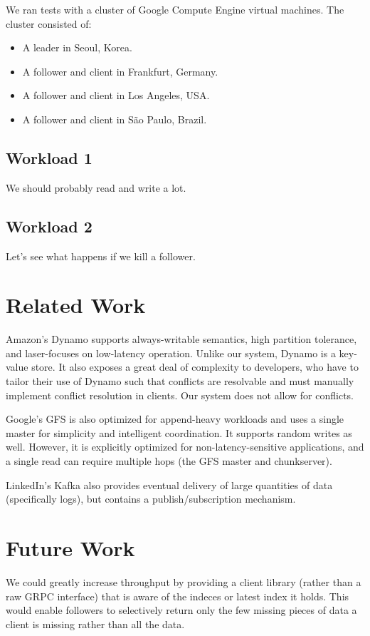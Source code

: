 \documentclass[11pt,english,twocolumn]{article}
\begin{document}
We ran tests with a cluster of Google Compute Engine virtual
machines. The cluster consisted of:

\begin{itemize}
	\item A leader in Seoul, Korea.
	\item A follower and client in Frankfurt, Germany.
	\item A follower and client in Los Angeles, USA.
	\item A follower and client in São Paulo, Brazil.
\end{itemize}

\subsection{Workload 1}
We should probably read and write a lot.

\subsection{Workload 2}
Let's see what happens if we kill a follower.

\section{Related Work}
Amazon's Dynamo \cite{Dynamo} supports always-writable semantics, high partition
tolerance, and laser-focuses on low-latency operation. Unlike our system, Dynamo
is a key-value store. It also exposes a great deal of complexity to developers,
who have to tailor their use of Dynamo such that conflicts are resolvable and
must manually implement conflict resolution in clients. Our system does not
allow for conflicts.

Google's GFS \cite{GFS} is also optimized for append-heavy workloads and uses a
single master for simplicity and intelligent coordination. It supports random
writes as well. However, it is explicitly optimized for non-latency-sensitive
applications, and a single read can require multiple hops (the GFS master and
chunkserver).

LinkedIn's Kafka \cite{Kafka} also provides eventual delivery of large
quantities of data (specifically logs), but contains a publish/subscription
mechanism.

\section{Future Work}
We could greatly increase throughput by providing a client library (rather than
a raw GRPC interface) that is aware of the indeces or latest index it holds.
This would enable followers to selectively return only the few missing pieces of
data a client is missing rather than all the data.
\end{document}
